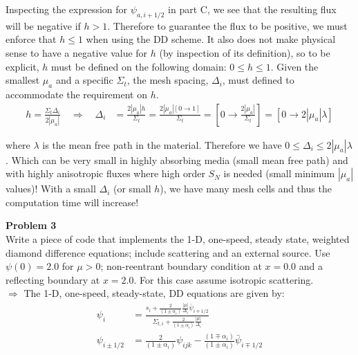 \documentclass[10pt]{article}
\begin{document}
Inspecting the expression for $\psi_{a,i+1/2}$ in part C, we see that the resulting flux will be negative if $h>1$. Therefore to guarantee the flux to be positive, we must enforce that $h\leq1$ when using the DD scheme. It also does not make physical sense to have a negative value for $h$ (by inspection of its definition), so to be explicit, $h$ must be defined on the following domain: $0\leq h \leq 1$. Given the smallest $\mu_a$ and a specific $\Sigma_t$, the mesh spacing, $\Delta_i$, must defined to accommodate the requirement on $h$.
%
\begin{align*}
    h=\frac{\Sigma_t \Delta_i}{2|\mu_a|} \quad \Rightarrow \quad \Delta_i &= \frac{2|\mu_a| h}{\Sigma_t} = \frac{2|\mu_a| [0\rightarrow1]}{\Sigma_t} = [0 \rightarrow \frac{2|\mu_a|}{\Sigma_t}] = [0 \rightarrow 2|\mu_a| \lambda]
\end{align*}

where $\lambda$ is the mean free path in the material. Therefore we have $0 \leq \Delta_i \leq 2|\mu_a|\lambda$. Which can be very small in highly absorbing media (small mean free path) and with highly anisotropic fluxes where high order $S_N$ is needed (small minimum $|\mu_a|$ values)! With a small $\Delta_i$ (or small $h$), we have many mesh cells and thus the computation time will increase!









\newpage
\noindent \textbf{Problem 3}\\
Write a piece of code that implements the 1-D, one-speed, steady state, weighted diamond difference equations; include scattering and an external source. Use $\psi(0) = 2.0$ for $\mu > 0$; non-reentrant boundary condition at $x=0.0$ and a reflecting boundary at $x=2.0$. For this case assume isotropic scattering.\\

$\Rightarrow$ The 1-D, one-speed, steady-state, DD equations are given by:
%
\begin{align*}
    \psi_i &= \frac{s_i + \frac{2}{(1\pm\alpha_i)}\frac{|\mu|}{\Delta_i}\bar{\psi}_{i\mp1/2}}{\Sigma_{t,i} + \frac{2}{(1\pm\alpha_i)}\frac{|\mu|}{\Delta_i}}\\
    \psi_{i\pm1/2} &= \frac{2}{(1\pm\alpha_i)}\psi_{ijk}-\frac{(1\mp\alpha_i)}{(1\pm\alpha_i)}\bar{\psi}_{i\mp1/2}
\end{align*}
\end{document}
